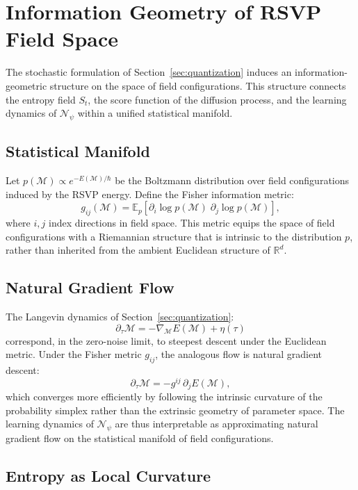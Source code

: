 \documentclass[11pt]{article}
\begin{document}
\section{Information Geometry of RSVP Field Space}
\label{sec:infogeo}

The stochastic formulation of Section~\ref{sec:quantization} induces an
information-geometric structure on the space of field configurations.
This structure connects the entropy field $S_t$, the score function of
the diffusion process, and the learning dynamics of $\mathcal{N}_\psi$
within a unified statistical manifold.

\subsection{Statistical Manifold}

Let $p(\mathcal{M}) \propto e^{-E(\mathcal{M})/\hbar}$ be the Boltzmann
distribution over field configurations induced by the RSVP energy.
Define the Fisher information metric:
\[
g_{ij}(\mathcal{M})
=
\mathbb{E}_{p}\!\left[
\partial_i \log p(\mathcal{M})\;
\partial_j \log p(\mathcal{M})
\right],
\]
where $i,j$ index directions in field space.
This metric equips the space of field configurations with a Riemannian
structure that is intrinsic to the distribution $p$, rather than inherited
from the ambient Euclidean structure of $\mathbb{R}^d$.

\subsection{Natural Gradient Flow}

The Langevin dynamics of Section~\ref{sec:quantization}:
\[
\partial_\tau \mathcal{M}
=
-\nabla_{\mathcal{M}} E(\mathcal{M}) + \eta(\tau)
\]
correspond, in the zero-noise limit, to steepest descent under the
Euclidean metric.
Under the Fisher metric $g_{ij}$, the analogous flow is natural gradient
descent:
\[
\partial_\tau \mathcal{M}
=
-g^{ij}\,\partial_j E(\mathcal{M}),
\]
which converges more efficiently by following the intrinsic curvature of
the probability simplex rather than the extrinsic geometry of parameter
space.
The learning dynamics of $\mathcal{N}_\psi$ are thus interpretable as
approximating natural gradient flow on the statistical manifold of field
configurations.

\subsection{Entropy as Local Curvature}
\end{document}
